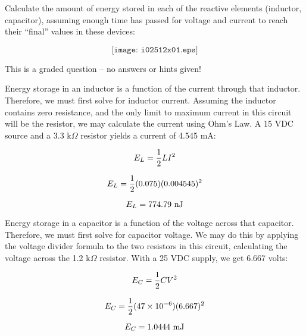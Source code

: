 

Calculate the amount of energy stored in each of the reactive elements (inductor, capacitor), assuming enough time has passed for voltage and current to reach their ``final'' values in these devices:

$$\texttt{[image: i02512x01.eps]}$$

\vfil

\eject






This is a graded question -- no answers or hints given!







Energy storage in an inductor is a function of the current through that inductor.  Therefore, we must first solve for inductor current.  Assuming the inductor contains zero resistance, and the only limit to maximum current in this circuit will be the resistor, we may calculate the current using Ohm's Law.  A 15 VDC source and a 3.3 k$\Omega$ resistor yields a current of 4.545 mA:

$$E_L = {1 \over 2} L I^2$$

$$E_L = {1 \over 2} (0.075) (0.004545)^2$$

$$E_L = 774.79 \hbox{ nJ}$$

\vskip 30pt

Energy storage in a capacitor is a function of the voltage across that capacitor.  Therefore, we must first solve for capacitor voltage.  We may do this by applying the voltage divider formula to the two resistors in this circuit, calculating the voltage across the 1.2 k$\Omega$ resistor.  With a 25 VDC supply, we get 6.667 volts:

$$E_C = {1 \over 2} C V^2$$

$$E_C = {1 \over 2} (47 \times 10^{-6}) (6.667)^2$$

$$E_C = 1.0444 \hbox{ mJ}$$




